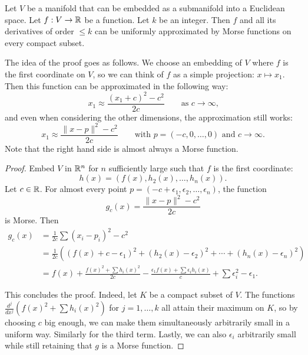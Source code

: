 \begin{prop}
    Let $V$ be a manifold that can be embedded as a submanifold into a Euclidean space.
    Let $f: V \to  \mathbb{R}$ be a function.
    Let $k$ be an integer.
    Then $f$ and all its derivatives of order $\le k$ can be uniformly
    approximated by Morse functions on every compact subset.
\end{prop}

The idea of the proof goes as follows.
We choose an embedding of $V$ where $f$ is the first coordinate on $V$, so we can think of $f$ as a simple projection: $x \mapsto x_1$.
Then this function can be approximated in the following way:
\[
    x_1 \approx \frac{(x_1+c)^2 - c^2}{2c} \qquad \text{as $c \to  \infty$,}
\]
and even when considering the other dimensions, the approximation still works:
\[
    x_1 \approx \frac{\|x - p\|^2 - c^2}{2c} \qquad \text{with $p = (-c, 0, \ldots, 0)$ and $c\to  \infty$}
.\] 
Note that the right hand side is almost always a Morse function.

\begin{proof}
    Embed $V$ in $\mathbb{R}^{n}$ for $n$ sufficiently large such that $f$ is the first coordinate:
    \[
        h(x) = (f(x), h_2(x), \ldots, h_n(x))
    .\] 
    Let $c \in \mathbb{R}$. For almost every point $p = (-c + \epsilon_1, \epsilon_2, \ldots, \epsilon_n)$, the function
    \[
        g_c(x) = \frac{\|x - p\|^2 - c^2}{2c} 
    \] 
    is Morse.
    Then
    \begin{align*}
        g_c(x) &= \frac{1}{2c}  \sum (x_i - p_i)^2 - c^2\\
             &= \frac{1}{2c} \left((f(x) + c - \epsilon_1 )^2 + (h_2(x) - \epsilon_2)^2 + \cdots + (h_n(x) - \epsilon_n)^2\right)\\
             &= f(x) +  \frac{f(x)^2 + \sum h_i(x)^2}{2c} - \frac{\epsilon_1 f(x)  + \sum \epsilon_i h_i(x)}{c}  + \sum \epsilon_i^2 - \epsilon_1
    .\end{align*} 

    This concludes the proof.
    Indeed, let $K$ be a compact subset of $V$.
    The functions $\frac{d^{j}}{dx^{j}} (f(x)^2 + \sum h_i(x)^2)$ for $j = 1, \ldots,k$ all attain their maximum on $K$, so by choosing $c$ big enough, we can make them simultaneously arbitrarily small in a uniform way. Similarly for the third term.
    Lastly, we can also $\epsilon_i$ arbitrarily small while still retaining that $g$ is a Morse function.
\end{proof}

\begin{figure}
    \centering
    \label{fig:approximate-morse-functions}
\end{figure}
